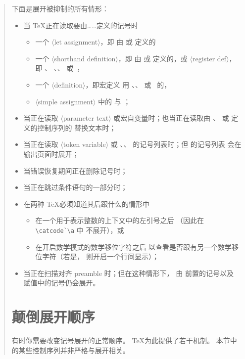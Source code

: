 \documentclass[a4paper]{rapport3}
\def\gr#1{$\langle$#1$\rangle$}\def\key#1{{\tt#1}}
\newenvironment{disp}{\begin{quotation}}{\end{quotation}}
\begin{document}
\begin{disp}
下面是展开被抑制的所有情形：
\begin{itemize}\label{noexp:list}
\item 当 \TeX 正在读取要由……定义的记号时
      \begin{itemize} \item 一个 \gr{let assignment}，即
           由  或  定义的
        \item 一个 \gr{shorthand definition}，即
           由  或  定义的，或
           \gr{register def}，即 、
           、、
           或~，
        \item 一个 \gr{definition}，即宏定义
           用 、、 或~ 的，
        \item \gr{simple assignment} 中的  与 ；
      \end{itemize}
\item 当正在读取 \gr{parameter text} 或宏自变量时；也当正在读取由
      、 或  定义的控制序列的
      替换文本时；
\item 当正在读取 \gr{token variable} 或
      、、
      的记号列表时；但  的记号列表
      会在输出页面时展开；
\item 当错误恢复期间正在删除记号时；
\item 当正在跳过条件语句的一部分时；
\item 在两种 \TeX 必须知道其后跟什么的情形中
      \begin{itemize}\item 在一个用于表示整数的上下文中的左引号之后
         （因此在
         \verb-\catcode`\a- 中  不展开），或
        \item 在开启数学模式的数学移位字符之后
         以查看是否跟有另一个数学移位字符（若是，
         则开启一个行间显示）；
        \end{itemize}
\item 当正在扫描对齐 preamble 时；但在这种情形下，
      由  前置的记号以及
       赋值中的记号仍会展开。
\end{itemize}

\section{颠倒展开顺序}

有时你需要改变记号展开的正常顺序。
\TeX 为此提供了若干机制。
本节中的某些控制序列并非严格与展开相关。


\end{disp}
\end{document}
